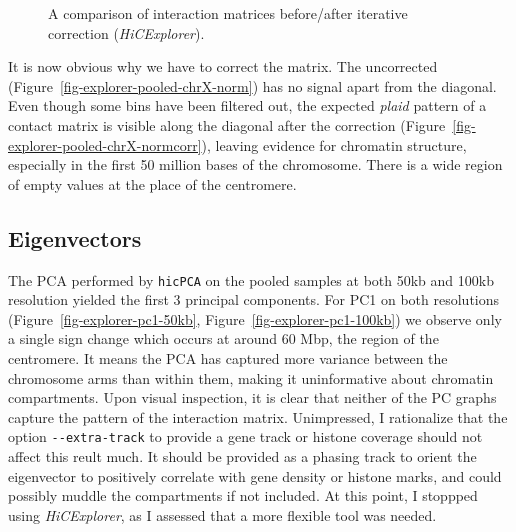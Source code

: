 \documentclass[
  11pt,
  a4paper,
]{scrbook}
\let\oldemph\emph
\renewcommand\emph[1]{\oldemph{\color{gray}#1}}
\begin{document}
\begin{figure}
\begin{minipage}{0.50\linewidth}
{}


\end{minipage}%

\caption{\label{fig-explorer-pooled-norm-normcorr}A comparison of
interaction matrices before/after iterative correction
(\emph{HiCExplorer}).}

\end{figure}%

It is now obvious why we have to correct the matrix. The uncorrected
(Figure~\ref{fig-explorer-pooled-chrX-norm}) has no signal apart from
the diagonal. Even though some bins have been filtered out, the expected
\emph{plaid} pattern of a contact matrix is visible along the diagonal
after the correction (Figure~\ref{fig-explorer-pooled-chrX-normcorr}),
leaving evidence for chromatin structure, especially in the first 50
million bases of the chromosome. There is a wide region of empty values
at the place of the centromere.

\subsection{Eigenvectors}\label{eigenvectors}

The PCA performed by \texttt{hicPCA} on the pooled samples at both 50kb
and 100kb resolution yielded the first 3 principal components. For PC1
on both resolutions (Figure~\ref{fig-explorer-pc1-50kb},
Figure~\ref{fig-explorer-pc1-100kb}) we observe only a single sign
change which occurs at around 60 Mbp, the region of the centromere. It
means the PCA has captured more variance between the chromosome arms
than within them, making it uninformative about chromatin compartments.
Upon visual inspection, it is clear that neither of the PC graphs
capture the pattern of the interaction matrix. Unimpressed, I
rationalize that the option \texttt{-\/-extra-track} to provide a gene
track or histone coverage should not affect this reult much. It should
be provided as a phasing track to orient the eigenvector to positively
correlate with gene density or histone marks, and could possibly muddle
the compartments if not included. At this point, I stoppped using
\emph{HiCExplorer}, as I assessed that a more flexible tool was needed.
\end{document}
